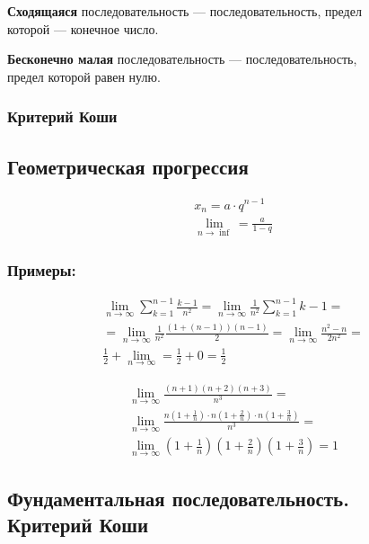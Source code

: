 \documentclass{article}
\begin{document}
\textbf{Сходящаяся} последовательность --- последовательность, предел \\
которой --- конечное число.

\textbf{Бесконечно малая} последовательность --- последовательность, \\
предел которой равен нулю.

\subsubsection{Критерий Коши}

\subsection{Геометрическая прогрессия}

\begin{gather*}
	x_n = a \cdot q^{n-1} \\
	\lim_{n \to \inf} = \frac{a}{1 - q}
\end{gather*}

\subsubsection*{Примеры:}

\begin{gather*}
	\lim_{n \to \infty} \sum_{k=1}^{n-1} \frac{k - 1}{n^2} = \lim_{n \to \infty} \frac{1}{n^2} \sum_{k=1}^{n-1} k - 1 = \\
	= \lim_{n \to \infty} \frac{1}{n^2} \frac{(1 + (n - 1))(n - 1)}{2} = \lim_{n \to \infty} \frac{n^2 - n}{2n^2} = \\
	\frac{1}{2} + \lim_{n \to \infty} = \frac{1}{2} + 0 = \frac{1}{2}
\end{gather*}

\begin{gather*}
	\lim_{n \to \infty} \frac{(n + 1)(n + 2)(n + 3)}{n^3} = \\
	\lim_{n \to \infty} \frac{n(1 + \frac{1}{n}) \cdot n(1 + \frac{2}{n}) \cdot n(1 + \frac{3}{n})}{n^3} = \\
	\lim_{n \to \infty} (1 + \frac{1}{n})(1 + \frac{2}{n})(1 + \frac{3}{n}) = 1
\end{gather*}

\subsection{Фундаментальная последовательность. \\
Критерий Коши}
\end{document}
